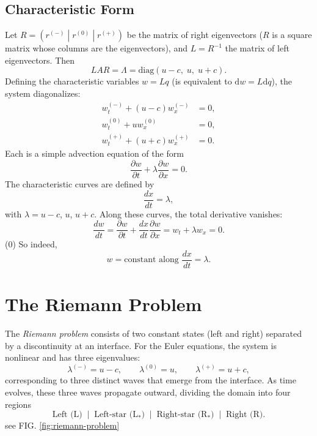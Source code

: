 \documentclass{article}
\begin{document}
\subsection*{Characteristic Form}

Let $R = (r^{(-)}\;|\;r^{(0)}\;|\;r^{(+)})$ be the matrix of right eigenvectors ($R$ is a square matrix whose columns are the eigenvectors), and $L = R^{-1}$ the matrix of left eigenvectors. Then
\begin{equation}
L A R = \Lambda = \mathrm{diag}(u-c, \; u, \; u+c).
\end{equation}
Defining the characteristic variables $w = L q$ (is equivalent to $\mathrm{d}w = L\mathrm{d}q$), the system diagonalizes:
\begin{align}
w^{(-)}_{t} + (u-c) w^{(-)}_{x} &= 0, \\
w^{(0)}_{t} + u w^{(0)}_{x} &= 0, \\
w^{(+)}_{t} + (u+c) w^{(+)}_{x} &= 0.
\end{align}
Each is a simple advection equation of the form
\[
\frac{\partial w}{\partial t} + \lambda \frac{\partial w}{\partial x} = 0.
\]
The characteristic curves are defined by
\[
\frac{dx}{dt} = \lambda,
\]
with $\lambda = u-c$, $u$, $u+c$.
Along these curves, the total derivative vanishes:
\[
\frac{d w}{dt} = \frac{\partial w}{\partial t} + \frac{dx}{dt}\frac{\partial w}{\partial x}
= w_t + \lambda w_x = 0.
\]{(0)}
So indeed,
\[
w = \text{constant along } \frac{dx}{dt} = \lambda.
\]


\section*{The Riemann Problem}
The \emph{Riemann problem} consists of two constant states (left and right) separated
by a discontinuity at an interface. For the Euler equations, the system is nonlinear
and has three eigenvalues:
\[
\lambda^{(-)} = u - c, \qquad
\lambda^{(0)} = u, \qquad
\lambda^{(+)} = u + c ,
\]
corresponding to three distinct waves that emerge from the interface. As time evolves, these three waves propagate outward, dividing the domain into four regions
\[
\text{Left (L)} \;\;|\;\; \text{Left-star (L$_*$)} \;\;|\;\;
\text{Right-star (R$_*$)} \;\;|\;\; \text{Right (R)}.
\]
see FIG. \ref{fig:riemann-problem}
\end{document}
